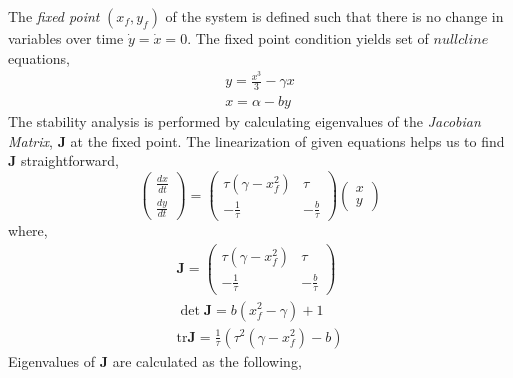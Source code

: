 The \textit{fixed point} $(x_f, y_f)$ of the system is defined such that there is no change in variables over time $\dot{y} =\dot{x} = 0 $. The fixed point condition yields set of $nullcline$ equations, 
\begin{subequations}
\begin{align}  y = \frac{x^3}{3} - \gamma x
              \label{eqn: frobenius 3}\\  
               x = \alpha - b y
               \label{eqn: frobenius 4}   \end{align} 
\end{subequations}
The stability analysis is performed by calculating eigenvalues of the \textit{Jacobian Matrix}, \textbf{J} at the fixed point. The  linearization of given equations helps us to find  \textbf{J} straightforward,
\begin{equation}
%
    \begin{pmatrix}
        \frac{dx}{dt} \\ \frac{dy}{dt}
     \end{pmatrix} = \begin{pmatrix}
        \tau(\gamma - x_f^2) & \tau \\
        -\frac{1}{\tau}     & -\frac{b}{\tau}
     \end{pmatrix}
    \begin{pmatrix}
        x \\
        y
    \end{pmatrix}
%
\end{equation}
where,
\begin{subequations}
\begin{align} \textbf{J} = \begin{pmatrix} \tau(\gamma - x_f^2) & \tau \\ -\frac{1}{\tau}     & -\frac{b}{\tau}   \end{pmatrix}
              \label{eqn: frobenius 5}\\  
 \det \textbf{J} =  b(x_f^2 - \gamma) +1
               \label{eqn: frobenius 6} \\   
\mathrm{tr} \textbf{J} =  \frac{1}{\tau}(\tau^2( \gamma - x_f^2 ) -b)
               \label{eqn: frobenius 7}                 
               \end{align} 
\end{subequations}
Eigenvalues of \textbf{J} are calculated as the following,
